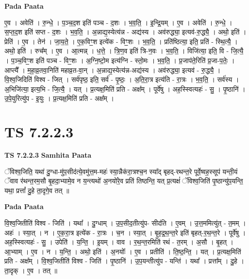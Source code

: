 \documentclass[17pt]{extarticle}
\begin{document}
\textbf{Pada Paata} \newline

ए॒व । अवेति॑ । रु॒न्धे॒ । प॒ञ्च॒द॒श इति॑ पञ्च - द॒शः । भ॒व॒ति॒ । इ॒न्द्रि॒यम् । ए॒व । अवेति॑ । रु॒न्धे॒ । स॒प्त॒द॒श इति॑ सप्त - द॒शः । भ॒व॒ति॒ । अ॒न्नाद्य॒स्येत्य॑न्न - अद्य॑स्य । अव॑रुद्ध्या॒ इत्यव॑-रु॒द्ध्यै॒ । अथो॒ इति॑ । प्रेति॑ । ए॒व । तेन॑ । जा॒य॒ते॒ । ए॒क॒विꣳ॒॒श इत्ये॑क - विꣳ॒॒शः । भ॒व॒ति॒ । प्रति॑ष्ठित्या॒ इति॒ प्रति॑ - स्थि॒त्यै॒ । अथो॒ इति॑ । रुच᳚म् । ए॒व । आ॒त्मन्न् । ध॒त्ते॒ । त्रि॒ण॒व इति॑ त्रि-न॒वः । भ॒व॒ति॒ । विजि॑त्या॒ इति॒ वि - जि॒त्यै॒ । प॒ञ्च॒विꣳ॒॒श इति॑ पञ्च - विꣳ॒॒शः । अ॒ग्नि॒ष्टो॒म इत्य॑ग्नि - स्तो॒मः । भ॒व॒ति॒ । प्र॒जाप॑ते॒रिति॑ प्र॒जा-प॒तेः॒ । आप्त्यै᳚ । म॒हा॒व्र॒तवा॒निति॑ महाव्र॒त-वा॒न् । अ॒न्नाद्य॒स्येत्य॑न्न-अद्य॑स्य । अव॑रुद्ध्या॒ इत्यव॑ - रु॒द्ध्यै॒ । वि॒श्व॒जिदिति॑ विश्व - जित् । सर्व॑पृष्ठ॒ इति॒ सर्व॑ - पृ॒ष्ठः॒ । अ॒ति॒रा॒त्र इत्य॑ति - रा॒त्रः । भ॒व॒ति॒ । सर्व॑स्य । अ॒भिजि॑त्या॒ इत्य॒भि - जि॒त्यै॒ । यत् । प्र॒त्यक्ष॒मिति॑ प्रति - अक्ष᳚म् । पूर्वे॑षु । अह॒स्स्वित्यहः॑ - सु॒ । पृ॒ष्ठानि॑ । उ॒पे॒युरित्यु॑प - इ॒युः । प्र॒त्यक्ष॒मिति॑ प्रति - अक्ष᳚म् ।  \newline





\section{ TS 7.2.2.3 }

\textbf{TS 7.2.2.3 } \newline
\textbf{Samhita Paata} \newline

ॅविश्व॒जिति॒ यथा॑ दु॒ग्धा-मु॑प॒सीद॑त्ये॒वमु॑त्त॒म-महः॑ स्या॒न्नैक॑रा॒त्रश्च॒न स्या᳚द् बृहद्-रथन्त॒रे पूर्वे॒ष्वह॒स्सूप॑ यन्ती॒यं ॅवाव र॑थन्त॒रम॒सौ बृ॒हदा॒भ्यामे॒व न य॒न्त्यथो॑ अ॒नयो॑रे॒व प्रति॑ तिष्ठन्ति॒ यत् प्र॒त्यक्षं॑ ॅविश्व॒जिति॑ पृ॒ष्ठान्यु॑प॒यन्ति॒ यथा॒ प्रत्तां᳚ दु॒हे ता॒दृगे॒व तत् ॥ \newline

\textbf{Pada Paata} \newline

वि॒श्व॒जितीति॑ विश्व - जिति॑ । यथा᳚ । दु॒ग्धाम् । उ॒प॒सीद॒तीत्यु॑प- सीद॑ति । ए॒वम् । उ॒त्त॒ममित्यु॑त् - त॒मम् । अहः॑ । स्या॒त् । न । ए॒क॒रा॒त्र इत्ये॑क - रा॒त्रः । च॒न । स्या॒त् । बृ॒ह॒द्र॒थ॒न्त॒रे इति॑ बृहत्-र॒थ॒न्त॒रे । पूर्वे॑षु । अह॒स्स्वित्यहः॑ - सु॒ । उपेति॑ । य॒न्ति॒ । इ॒यम् । वाव । र॒थ॒न्त॒रमिति॑ रथं - त॒रम् । अ॒सौ । बृ॒हत् । आ॒भ्याम् । ए॒व । न । य॒न्ति॒ । अथो॒ इति॑ । अ॒नयोः᳚ । ए॒व । प्रतीति॑ । ति॒ष्ठ॒न्ति॒ । यत् । प्र॒त्यक्ष॒मिति॑ प्रति - अक्ष᳚म् । वि॒श्व॒जितीति॑ विश्व - जिति॑ । पृ॒ष्ठानि॑ । उ॒प॒यन्तीत्यु॑प - यन्ति॑ । यथा᳚ । प्रत्ता᳚म् । दु॒हे । ता॒दृक् । ए॒व । तत् ॥  \newline
\end{document}
